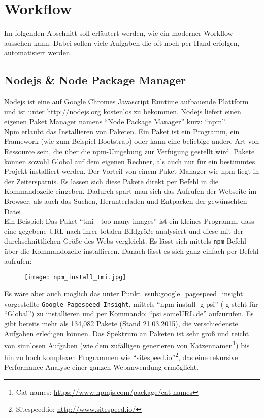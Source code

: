 \section{Workflow} %
\label{sec:workflow}
	Im folgenden Abschnitt soll erläutert werden, wie ein moderner Workflow aussehen kann. Dabei sollen viele Aufgaben die oft noch per Hand erfolgen, automatisiert werden.\\

	\subsection{Nodejs \& Node Package Manager} %
	\label{sub:node_package_manager}
		Nodejs ist eine auf Google Chromes Javascript Runtime aufbauende Plattform und ist unter \url{http://nodejs.org} kostenlos zu bekommen. Nodejs liefert einen eigenen Paket Manager namens "`Node Package Manager"' kurz: "`npm"'.\\

		Npm erlaubt das Installieren von Paketen. Ein Paket ist ein Programm, ein Framework (wie zum Beispiel Bootstrap) oder kann eine beliebige andere Art von Ressource sein, die über die npm-Umgebung zur Verfügung gestellt wird. Pakete können sowohl Global auf dem eigenen Rechner, als auch nur für ein bestimmtes Projekt installiert werden. Der Vorteil von einem Paket Manager wie npm liegt in der Zeitersparnis. Es lassen sich diese Pakete direkt per Befehl in die Kommandozeile eingeben. Dadurch spart man sich das Aufrufen der Webseite im Browser, als auch das Suchen, Herunterladen und Entpacken der gewünschten Datei.\\

		Ein Beispiel: Das Paket "`tmi - too many images"' ist ein kleines Programm, dass eine gegebene URL nach ihrer totalen Bildgröße analysiert und diese mit der durchschnittlichen Größe des Webs vergleicht. Es lässt sich mittels \texttt{npm}-Befehl über die Kommandozeile installieren. Danach lässt es sich ganz einfach per Befehl aufrufen:
		\begin{figure}[htbp]
			\begin{center}
				\texttt{[image: npm\_install\_tmi.jpg]}
				\label{fig:npm_install_tmi}
			\end{center}
		\end{figure}
		

		Es wäre aber auch möglich das unter Punkt \ref{ssub:google_pagespeed_insight} vorgestellte \texttt{Google Pagespeed Insight}, mittels "`npm install -g psi"' (-g steht für "`Global"') zu installieren und per Kommando: "`psi someURL.de"' aufzurufen. Es gibt bereits mehr als 134,082 Pakete (Stand 21.03.2015), die verschiedenste Aufgaben erledigen können. Das Spektrum an Paketen ist sehr groß und reicht von sinnlosen Aufgaben (wie dem zufälligen generieren von Katzennamen\footnote{Cat-names: \url{https://www.npmjs.com/package/cat-names}}) bis hin zu hoch komplexen Programmen wie "`sitespeed.io"'\footnote{Sitespeed.io: \url{http://www.sitespeed.io/}}, das eine rekursive Performance-Analyse einer ganzen Webanwendung ermöglicht.\\

